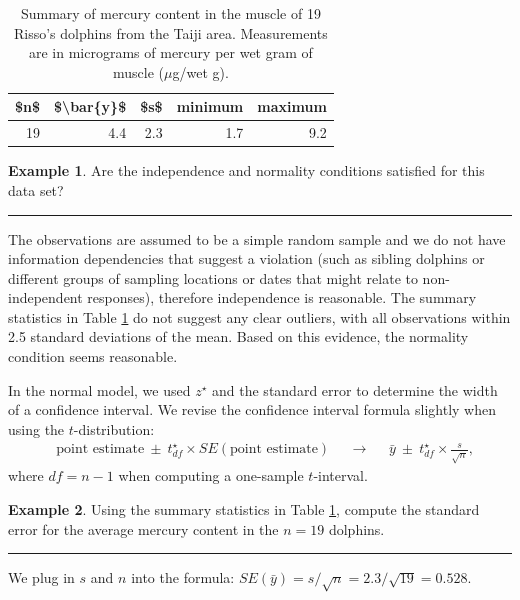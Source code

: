 \documentclass[
  10pt,
  openany]{book}
\theoremstyle{definition}
\theoremstyle{definition}
\newtheorem{example}{Example}[chapter]
\theoremstyle{definition}
\theoremstyle{definition}
\theoremstyle{remark}
\begin{document}
\begin{table}
\centering
\caption{\label{tab:summaryStatsOfHgInMuscleOfRissosDolphins}Summary of mercury content in the muscle of 19 Risso's dolphins from the Taiji area. Measurements are in micrograms of mercury per wet gram
    of muscle ($\mu$g/wet g).}
\centering
\begin{tabular}[t]{r|r|r|r|r}
\hline
\$n\$ & \$\textbackslash{}bar\{y\}\$ & \$s\$ & minimum & maximum\\
\hline
19 & 4.4 & 2.3 & 1.7 & 9.2\\
\hline
\end{tabular}
\end{table}

\begin{example}
Are the independence and
normality conditions satisfied for this data set?

\begin{center}\rule{0.5\linewidth}{0.5pt}\end{center}

The observations are assumed to be a simple random sample and we do not have information dependencies that suggest a violation (such as sibling dolphins or different groups of sampling locations or dates that might relate to non-independent responses),
therefore independence is reasonable.
The summary statistics in
Table \ref{tab:summaryStatsOfHgInMuscleOfRissosDolphins}
do not suggest any clear outliers, with
all observations within 2.5 standard deviations
of the mean.
Based on this evidence, the normality condition
seems reasonable.
\end{example}

In the normal model, we used \(z^{\star}\) and the standard error to determine the width of a confidence interval. We revise the confidence interval formula slightly when using the \(t\)-distribution:
\begin{align*}
&\text{point estimate} \ \pm\  t^{\star}_{df} \times SE(\text{point estimate})
&&\to
&&\bar{y} \ \pm\  t^{\star}_{df} \times \frac{s}{\sqrt{n}},
\end{align*}
where \(df = n - 1\) when computing a one-sample \(t\)-interval.

\begin{example}
Using the summary statistics in
Table \ref{tab:summaryStatsOfHgInMuscleOfRissosDolphins},
compute the standard error for the average
mercury content in the \(n = 19\) dolphins.

\begin{center}\rule{0.5\linewidth}{0.5pt}\end{center}

We plug in \(s\) and \(n\) into the formula:
\(SE(\bar{y})
    = s / \sqrt{n}
    = 2.3 / \sqrt{19}
    = 0.528\).
\end{example}
\end{document}
